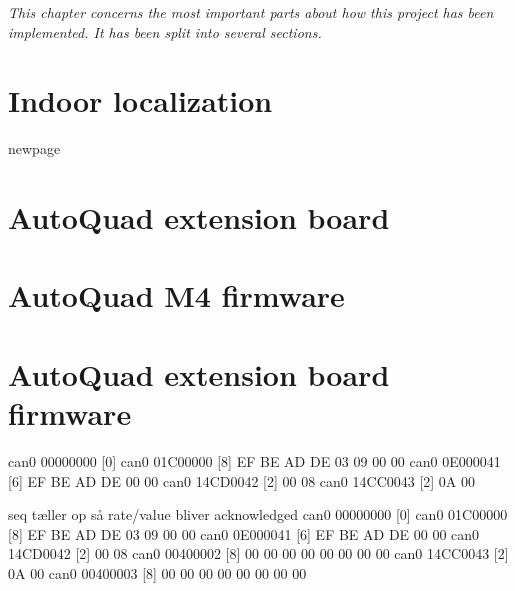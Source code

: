 \textit{This chapter concerns the most important parts about how this project has been implemented. It has been split into several sections.}

\section{Indoor localization}

newpage

\section{AutoQuad extension board}

\newpage

\section{AutoQuad M4 firmware}
\newpage

\section{AutoQuad extension board firmware}


\newpage


  can0  00000000   [0] 
  can0  01C00000   [8]  EF BE AD DE 03 09 00 00
  can0  0E000041   [6]  EF BE AD DE 00 00
  can0  14CD0042   [2]  00 08
  can0  14CC0043   [2]  0A 00



seq tæller op så rate/value bliver acknowledged
  can0  00000000   [0] 
  can0  01C00000   [8]  EF BE AD DE 03 09 00 00
  can0  0E000041   [6]  EF BE AD DE 00 00
  can0  14CD0042   [2]  00 08
  can0  00400002   [8]  00 00 00 00 00 00 00 00
  can0  14CC0043   [2]  0A 00
  can0  00400003   [8]  00 00 00 00 00 00 00 00


\newpage